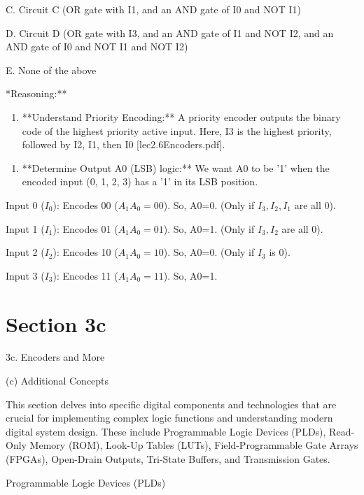 \documentclass{article}
\begin{document}
    \item C. Circuit C (OR gate with I1, and an AND gate of I0 and NOT I1)

    \item D. Circuit D (OR gate with I3, and an AND gate of I1 and NOT I2, and an AND gate of I0 and NOT I1 and NOT I2)

    \item E. None of the above

\item **Reasoning:**

    \begin{enumerate}
\item **Understand Priority Encoding:** A priority encoder outputs the binary code of the highest priority active input. Here, I3 is the highest priority, followed by I2, I1, then I0 [lec2.6Encoders.pdf].

\end{enumerate}
    \begin{enumerate}
\item **Determine Output A0 (LSB) logic:** We want A0 to be '1' when the encoded input (0, 1, 2, 3) has a '1' in its LSB position.

\end{enumerate}
         Input 0 ($I_0$): Encodes 00 ($A_1A_0=00$). So, A0=0. (Only if $I_3, I_2, I_1$ are all 0).

         Input 1 ($I_1$): Encodes 01 ($A_1A_0=01$). So, A0=1. (Only if $I_3, I_2$ are all 0).

         Input 2 ($I_2$): Encodes 10 ($A_1A_0=10$). So, A0=0. (Only if $I_3$ is 0).

         Input 3 ($I_3$): Encodes 11 ($A_1A_0=11$). So, A0=1.

\section{Section 3c}

3c. Encoders and More

(c) Additional Concepts

This section delves into specific digital components and technologies that are crucial for implementing complex logic functions and understanding modern digital system design. These include Programmable Logic Devices (PLDs), Read-Only Memory (ROM), Look-Up Tables (LUTs), Field-Programmable Gate Arrays (FPGAs), Open-Drain Outputs, Tri-State Buffers, and Transmission Gates.

Programmable Logic Devices (PLDs)
\end{document}
